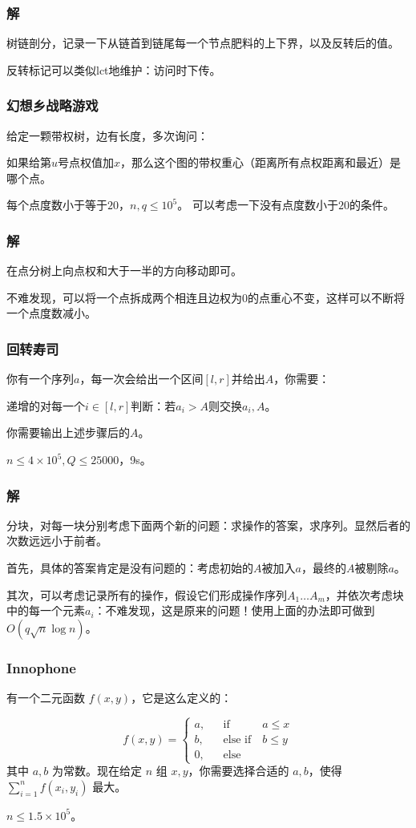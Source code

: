 \documentclass[10pt]{beamer}
\begin{document}
	\begin{frame}
		\frametitle{解}
	
		树链剖分，记录一下从链首到链尾每一个节点肥料的上下界，以及反转后的值。

		反转标记可以类似lct地维护：访问时下传。
	
	\end{frame}
	\begin{frame}
		\frametitle{幻想乡战略游戏}
	
		给定一颗带权树，边有长度，多次询问：

		如果给第$u$号点权值加$x$，那么这个图的带权重心（距离所有点权距离和最近）是哪个点。

		每个点度数小于等于$20$，$n,q\le 10^5$。 可以考虑一下没有点度数小于$20$的条件。
	
	\end{frame}
	\begin{frame}
		\frametitle{解}
	
		在点分树上向点权和大于一半的方向移动即可。

		不难发现，可以将一个点拆成两个相连且边权为$0$的点重心不变，这样可以不断将一个点度数减小。
		
	\end{frame}
	\begin{frame}
		\frametitle{回转寿司}

		你有一个序列$a$，每一次会给出一个区间$[l,r]$并给出$A$，你需要：

		递增的对每一个$i\in[l,r]$判断：若$a_i>A$则交换$a_i,A$。

		你需要输出上述步骤后的$A$。

		$n\le 4\times 10^5,Q\le 25000$，9s。
	
	\end{frame}
	\begin{frame}
		\frametitle{解}
	
		分块，对每一块分别考虑下面两个新的问题：求操作的答案，求序列。显然后者的次数远远小于前者。

		首先，具体的答案肯定是没有问题的：考虑初始的$A$被加入$a$，最终的$A$被剔除$a$。

		其次，可以考虑记录所有的操作，假设它们形成操作序列$A_1\dots A_m$，并依次考虑块中的每一个元素$a_i$：不难发现，这是原来的问题！使用上面的办法即可做到$O(q\sqrt n\log n)$。
	\end{frame}
	\begin{frame}
		\frametitle{Innophone}
	
		有一个二元函数 $f(x,y)$，它是这么定义的：

		$$
 f(x,y)=\left\{
\begin{array}{rcl}
a, & & {\text{if} \quad \quad \ \ \ \ a \leq x}\\
b, & & {\text{else if} \quad b \leq y}\\
0, & & {\text{else}}
\end{array} \right.
$$
		其中 $a,b$ 为常数。现在给定 $n$ 组 $x,y$，你需要选择合适的 $a,b$，使得 
		$\sum_{i=1}^{n} f(x_i,y_i)$ 最大。

		$n\le 1.5\times 10^5$。
	
	\end{frame}
\end{document}
